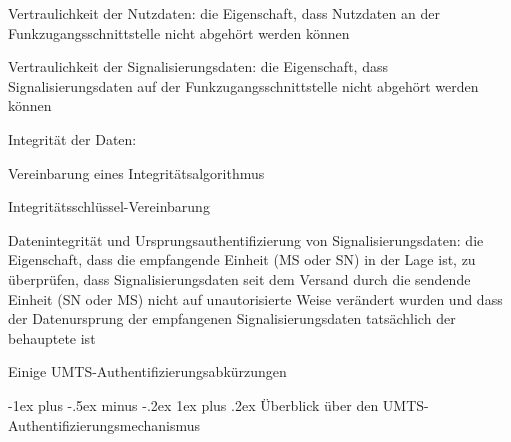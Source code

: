 \documentclass[a4paper]{article}
\makeatletter
\renewcommand{\subsubsection}{\@startsection{subsubsection}{3}{0mm}%
 {-1ex plus -.5ex minus -.2ex}%
 {1ex plus .2ex}%
 {\normalfont\small\bfseries}}
\makeatother
\begin{document}
\begin{multicols}{3}
\begin{itemize*}
\begin{itemize*}
                  \item Vertraulichkeit der Nutzdaten: die Eigenschaft, dass Nutzdaten an der Funkzugangsschnittstelle nicht abgehört werden können
                  \item Vertraulichkeit der Signalisierungsdaten: die Eigenschaft, dass Signalisierungsdaten auf der Funkzugangsschnittstelle nicht abgehört werden können
            \end{itemize*}
            \item Integrität der Daten:
            \begin{itemize*}
                  \item Vereinbarung eines Integritätsalgorithmus
                  \item Integritätsschlüssel-Vereinbarung
                  \item Datenintegrität und Ursprungsauthentifizierung von Signalisierungsdaten: die Eigenschaft, dass die empfangende Einheit (MS oder SN) in der Lage ist, zu überprüfen, dass Signalisierungsdaten seit dem Versand durch die sendende Einheit (SN oder MS) nicht auf unautorisierte Weise verändert wurden und dass der Datenursprung der empfangenen Signalisierungsdaten tatsächlich der behauptete ist
            \end{itemize*}
      \end{itemize*}

      Einige UMTS-Authentifizierungsabkürzungen



      \subsubsection{Überblick über den UMTS-Authentifizierungsmechanismus}


\end{multicols}
\end{document}
